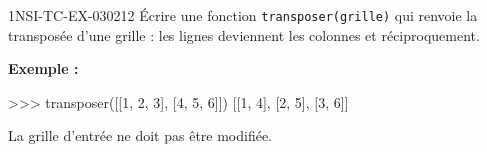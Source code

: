 \begin{exercice}{1NSI-TC-EX-030}{2}{12}
Écrire une fonction \lstinline{transposer(grille)} qui renvoie la transposée d'une
grille : les lignes deviennent les colonnes et réciproquement.

\textbf{Exemple :}
\begin{console}
>>> transposer([[1, 2, 3], [4, 5, 6]])
[[1, 4], [2, 5], [3, 6]]
\end{console}

La grille d'entrée ne doit pas être modifiée.
\end{exercice}
